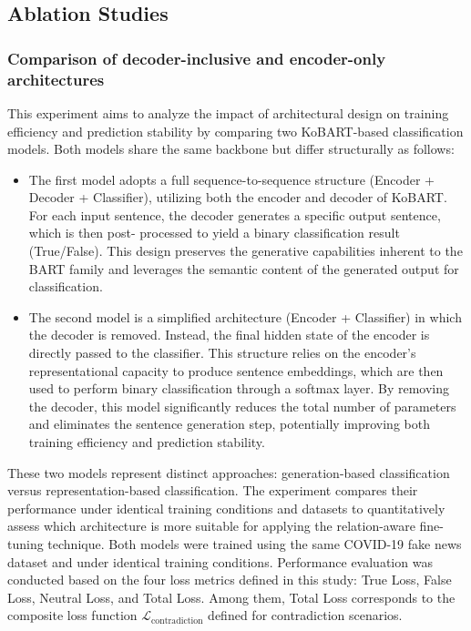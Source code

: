 \documentclass[a4paper,fleqn]{cas-sc}
\begin{document}
\subsection{Ablation Studies}

\subsubsection{Comparison of decoder-inclusive and encoder-only architectures}

This experiment aims to analyze the impact of architectural design on training efficiency and prediction stability by comparing two KoBART-based classification models. Both models share the same backbone but differ structurally as follows:

\begin{itemize}
    \item The first model adopts a full sequence-to-sequence structure (Encoder + Decoder +
    Classifier), utilizing both the encoder and decoder of KoBART. For each input
    sentence, the decoder generates a specific output sentence, which is then post-
    processed to yield a binary classification result (True/False). This design preserves the
    generative capabilities inherent to the BART family and leverages the semantic
    content of the generated output for classification.
    \item The second model is a simplified architecture (Encoder + Classifier) in which the
    decoder is removed. Instead, the final hidden state of the encoder is directly passed to
    the classifier. This structure relies on the encoder's representational capacity to
    produce sentence embeddings, which are then used to perform binary classification
    through a softmax layer. By removing the decoder, this model significantly reduces
    the total number of parameters and eliminates the sentence generation step, potentially
    improving both training efficiency and prediction stability.
\end{itemize}

These two models represent distinct approaches: generation-based classification versus representation-based classification. The experiment compares their performance under identical training conditions and datasets to quantitatively assess which architecture is more suitable for applying the relation-aware fine-tuning technique.
Both models were trained using the same COVID-19 fake news dataset and under identical training conditions. Performance evaluation was conducted based on the four loss metrics defined in this study: True Loss, False Loss, Neutral Loss, and Total Loss. Among them, Total Loss corresponds to the composite loss function \( \mathcal{L}_{\text{contradiction}} \) defined for contradiction scenarios.
\end{document}
